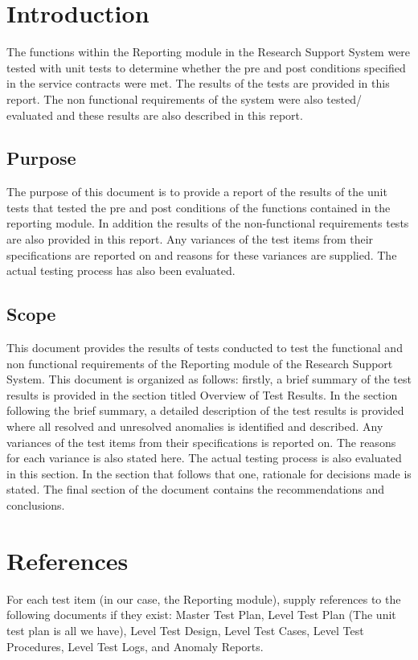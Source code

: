 \section{Introduction}
The functions within the Reporting module in the Research Support System were tested with unit tests to determine whether the pre and post conditions specified in the service contracts were met. The results of the tests are provided in this report. The non functional requirements of the system were also tested/ evaluated and these results are also described in this report.

\subsection{Purpose}
The purpose of this document is to provide a report of the results of the unit tests that tested the pre and post conditions of the functions contained in the reporting module. In addition the results of the non-functional requirements tests are also provided in this report. Any variances of the test items from their specifications are reported on and reasons for these variances are supplied. The actual testing process has also been evaluated. 
\subsection{Scope}
This document provides the results of tests conducted to test the functional and non functional requirements of the Reporting module of the Research Support System. This document is organized as follows: firstly, a brief summary of the test results is provided in the section titled Overview of Test Results. In the section following the brief summary, a detailed description of the test results is provided where all resolved and unresolved anomalies is identified and described. Any variances of the test items from their specifications is reported on. The reasons for each variance is also stated here. The actual testing process is also evaluated in this section. In the section that follows that one, rationale for decisions made is stated. The final section of the document contains the recommendations and conclusions.

\section{References}
For each test item (in our case, the Reporting module), supply references to the following documents if they exist: Master Test
Plan, Level Test Plan (The unit test plan is all we have), Level Test Design, Level Test Cases, Level Test Procedures, Level Test Logs,
and Anomaly Reports.

